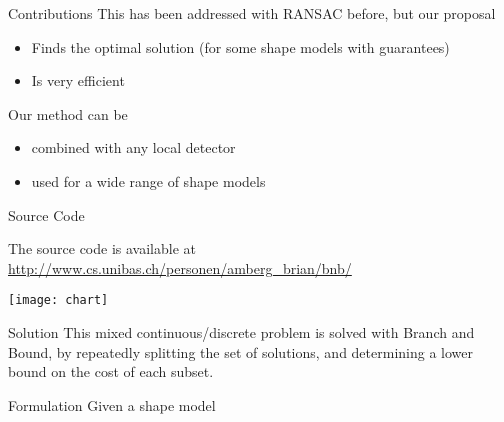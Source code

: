 \documentclass[landscape,final,a0paper,fontscale=0.27065]{baposter}
\begin{document}
\begin{poster}
\begin{posterbox}[name=contribution,column=0,below=problem,above=references]{Contributions}
  This has been addressed with RANSAC before, but our proposal
  \begin{itemize}
    \setlength{\itemsep}{0em}
  \item Finds the optimal solution (for some shape models with guarantees)
  \item Is very efficient
  \end{itemize}

  Our method can be 
  \begin{itemize}
    \setlength{\itemsep}{0em}
  \item combined with any local detector
  \item used for a wide range of shape models
  \end{itemize}
\end{posterbox}
  \begin{posterbox}[name=source,column=3,above=bottom]{Source Code}
  \noindent
  \begin{minipage}{\linewidth}
  \begin{minipage}{0.75\linewidth}
    \indent{}The source code is available at \\
    \url{http://www.cs.unibas.ch/personen/amberg_brian/bnb/}
  \end{minipage}\hfill%
  \begin{minipage}{0.23\linewidth}
  \hfill\texttt{[image: chart]}
  \end{minipage}
  \end{minipage}
  \end{posterbox}
  \begin{posterbox}[name=solution1,column=1,above=bottom]{Solution}
This mixed continuous/discrete problem is solved with Branch and Bound, by
repeatedly splitting the set of solutions, and determining a lower bound on the
cost of each subset.
  \end{posterbox}
  \begin{posterbox}[name=formulation,column=1,below=results,above=solution1]{Formulation}
Given a shape model 
\begin{align}

\end{align}
\end{posterbox}
\end{poster}
\end{document}
